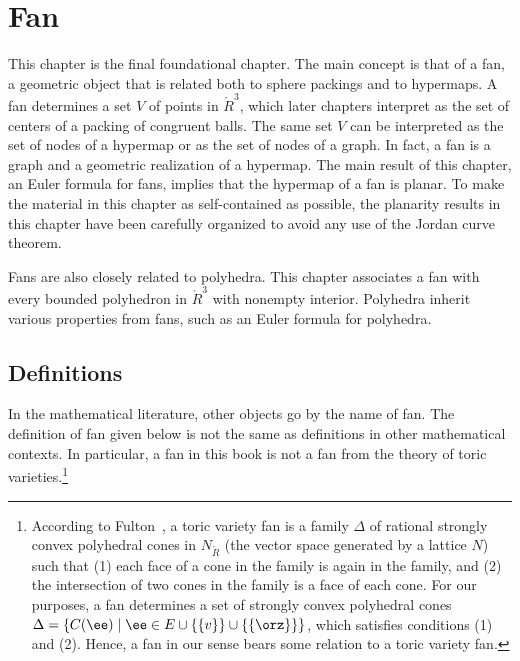 \chapter{Fan}\label{sec:fan}




\begin{summary}
  This chapter is the final foundational chapter.  The main concept is
  that of a fan, a geometric object that is related both to sphere
  packings and to hypermaps.  A fan determines a set $V$ of points in
  $\ring{R}^3$, which later chapters interpret as the set of centers
  of a packing of congruent balls.  The same set $V$ can be
  interpreted as the set of nodes of a hypermap or as the set of
  nodes of a graph.  In fact, a fan is a graph and a geometric
  realization of a hypermap.  The main result of this chapter, an
  Euler formula for fans,  implies that the hypermap of a
  fan is planar.  To make the material in this chapter as self-contained
 as possible, the planarity results in this chapter have been carefully
  organized to avoid any use of the Jordan curve theorem.

  Fans are also closely related to polyhedra.  This chapter associates
  a fan with every bounded polyhedron in $\ring{R}^3$ with nonempty
  interior.  Polyhedra inherit various properties from fans, such
  as an Euler formula for polyhedra.
\end{summary}


%
%
%
%
%

\section{Definitions}



\begin{remark}
  In the mathematical literature, other objects go by
  the name of fan.  The definition of fan given below is not the same
  as definitions in other mathematical contexts.  In particular, a fan
  in this book is not a fan from the theory of toric
  varieties.\footnote{According to
    Fulton~\cite{Fulton}, %
    a toric variety fan is a family $\Delta$ of rational strongly
    convex polyhedral cones in $N_{\ring{R}}$ (the vector space
    generated by a lattice $N$) such that (1) each face of a cone in
    the family is again in the family, and (2) the intersection of two
    cones in the family is a face of each cone.  For our purposes, a
    fan determines a set of strongly convex polyhedral cones $\Delta =
    \{ C(\ee)\mid \ee\in E\cup \{ \{v \} \} \cup \{ \{ \orz\} \} \}$,
    which satisfies conditions (1) and (2).  Hence, a fan in our sense
    bears some relation to a toric variety fan.}
\end{remark}

